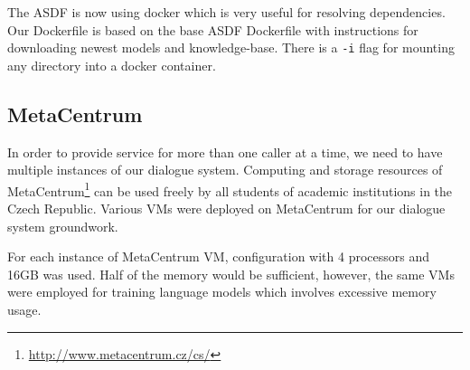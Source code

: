 The \acf{ASDF} is now using docker which is very useful for resolving dependencies.
Our Dockerfile is based on the base \ac{ASDF} 
Dockerfile with instructions for downloading newest models and knowledge-base.
There is a \texttt{-i} flag for mounting any directory into a docker container.

\subsection{MetaCentrum}

In order to provide service for more than one caller at a time, we need to have multiple instances of our dialogue system.
Computing and storage resources of MetaCentrum\footnote{\url{http://www.metacentrum.cz/cs/}} can be used freely by all students of academic institutions in the Czech Republic.
Various \acp{VM} were deployed on MetaCentrum for our dialogue system groundwork.

For each instance of MetaCentrum \ac{VM}, configuration with 4 processors and 16GB was used.
Half of the memory would be sufficient, however, the same \acp{VM} were employed for training language models which involves excessive memory usage.




